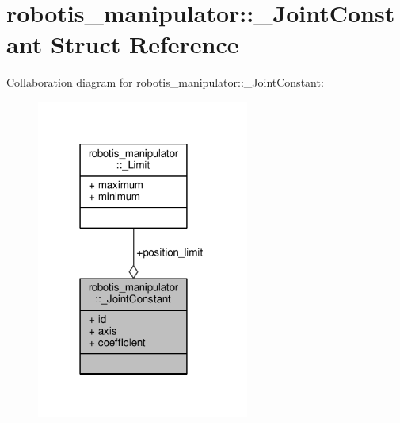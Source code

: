 \hypertarget{structrobotis__manipulator_1_1___joint_constant}{}\section{robotis\+\_\+manipulator\+:\+:\+\_\+\+Joint\+Constant Struct Reference}
\label{structrobotis__manipulator_1_1___joint_constant}


Collaboration diagram for robotis\+\_\+manipulator\+:\+:\+\_\+\+Joint\+Constant\+:
\nopagebreak
\begin{figure}[H]
\begin{center}
\leavevmode
\includegraphics[width=198pt]{structrobotis__manipulator_1_1___joint_constant__coll__graph}
\end{center}
\end{figure}
